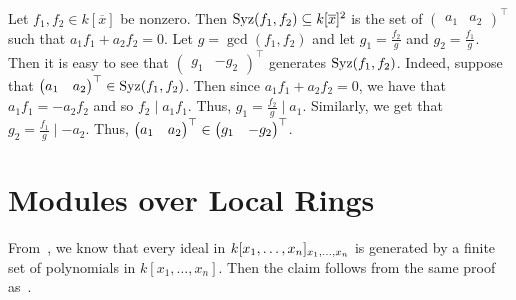 \documentclass[letterpaper, 11pt, oneside]{book}
\begin{document}
\begin{sol}\label{ex:UAG_5.3.12}
  Let $f_{1}, f_{2} \in k[\overline{x}]$ be nonzero.
  Then $\operatorname{Syz}(f_{1}, f_{2}) \subseteq k[\overline{x}]^{2}$ is the set of $\begin{pmatrix} a_{1} & a_{2} \end{pmatrix}^{\top}$ such that $a_{1}f_{1} + a_{2}f_{2} = 0$.
  Let $g = \gcd(f_{1}, f_{2})$ and let $g_{1} = \frac{f_{2}}{g}$ and $g_{2} = \frac{f_{1}}{g}$.
  Then it is easy to see that $\begin{pmatrix} g_{1} & -g_{2} \end{pmatrix}^{\top}$ generates $\operatorname{Syz}(f_{1}, f_{2})$.
  Indeed, suppose that $\begin{pmatrix} a_{1} & a_{2} \end{pmatrix}^{\top} \in \operatorname{Syz}(f_{1}, f_{2})$.
  Then since $a_{1}f_{1} + a_{2}f_{2} = 0$, we have that $a_{1}f_{1} = -a_{2}f_{2}$ and so $f_{2} \mid a_{1}f_{1}$.
  Thus, $g_{1} = \frac{f_{2}}{g} \mid a_{1}$.
  Similarly, we get that $g_{2} = \frac{f_{1}}{g} \mid -a_{2}$.
  Thus, $\begin{pmatrix} a_{1} & a_{2} \end{pmatrix}^{\top} \in \gen{\begin{pmatrix} g_{1} & -g_{2} \end{pmatrix}^{\top}}$.
\end{sol}

\clearpage

\section{Modules over Local Rings}

\begin{sol}\label{ex:UAG_5.4.1}
  From~, we know that every ideal in $k[x_{1}, \ldots, x_{n}]_{\ideal{x_{1}, \ldots, x_{n}}}$ is generated by a finite set of polynomials in $k[x_{1}, \ldots, x_{n}]$.
  Then the claim follows from the same proof as~\cite[\S 5.2, Proposition 2.3a]{book:UAG}.
\end{sol}
\end{document}
